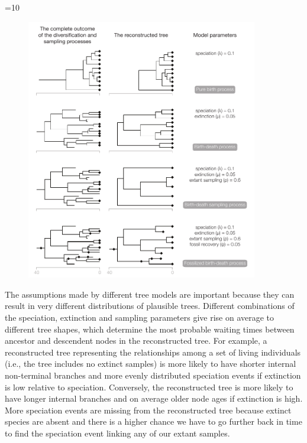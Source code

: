 \ifnum\value{num}=10{
\begin{figure}
\centering
\includegraphics[width=0.9\textwidth]{Cambridge-Elements/manuscript.R3/submitted_figs/figure5}

\end{figure} }\else{}\fi


The assumptions made by different tree models are important because they can result in very different distributions of plausible trees.
Different combinations of the speciation, extinction and sampling parameters give rise on average to different tree shapes, which determine the most probable waiting times between ancestor and descendent nodes
in the reconstructed tree.
For example, a reconstructed tree representing the relationships among a set of living individuals (i.e., the tree includes no extinct samples) is more likely to have shorter internal non-terminal branches and more evenly distributed speciation events if extinction is low relative to speciation.
Conversely, the reconstructed tree is more likely to have longer internal branches and on average older node ages if extinction is high.
More speciation events are missing from the reconstructed tree because extinct species are absent and there is a higher chance we have to go further back in time to find the speciation event linking any of our extant samples.

